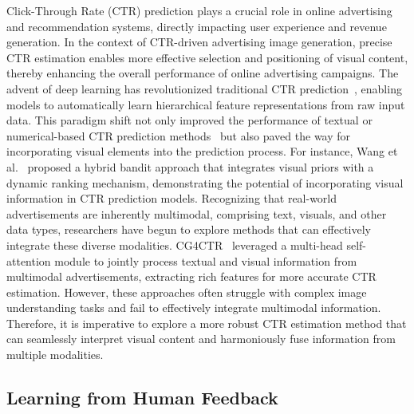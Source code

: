 Click-Through Rate (CTR) prediction plays a crucial role in online advertising and recommendation systems, directly impacting user experience and revenue generation. In the context of CTR-driven advertising image generation, precise CTR estimation enables more effective selection and positioning of visual content, thereby enhancing the overall performance of online advertising campaigns.
%
The advent of deep learning has revolutionized traditional CTR prediction~\cite{kumar2015predicting,juan2016field,jie2017ctr}, enabling models to automatically learn hierarchical feature representations from raw input data.
%
This paradigm shift not only improved the performance of textual or numerical-based CTR prediction methods~\cite{kumar2015predicting,jie2017ctr} but also paved the way for incorporating visual elements into the prediction process.
%
For instance, Wang et al.~\cite{wang2021hybrid} proposed a hybrid bandit approach that integrates visual priors with a dynamic ranking mechanism, demonstrating the potential of incorporating visual information in CTR prediction models.
%
Recognizing that real-world advertisements are inherently multimodal, comprising text, visuals, and other data types, researchers have begun to explore methods that can effectively integrate these diverse modalities. CG4CTR~\cite{yang2024new} leveraged a multi-head self-attention module to jointly process textual and visual information from multimodal advertisements, extracting rich features for more accurate CTR estimation.
%
However, these approaches often struggle with complex image understanding tasks and fail to effectively integrate multimodal information. Therefore, it is imperative to explore a more robust CTR estimation method that can seamlessly interpret visual content and harmoniously fuse information from multiple modalities.


\subsection{Learning from Human Feedback}

